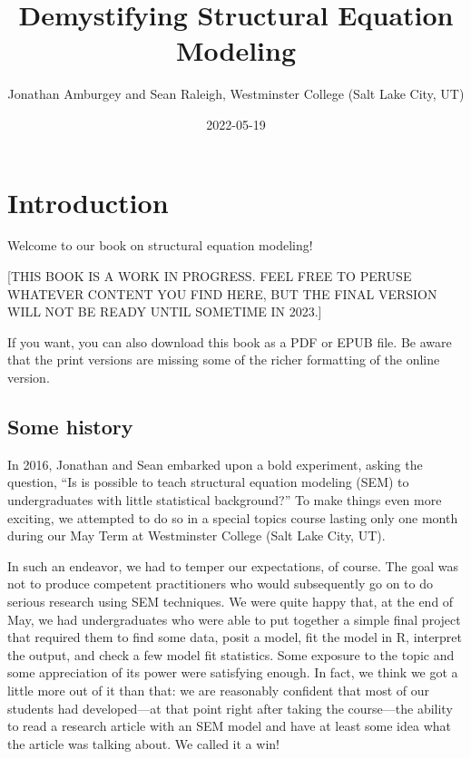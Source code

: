 \documentclass[
]{book}
\title{Demystifying Structural Equation Modeling}
\author{Jonathan Amburgey and Sean Raleigh, Westminster College (Salt Lake City, UT)}
\date{2022-05-19}
\begin{document}
\maketitle

{
\setcounter{tocdepth}{1}
\tableofcontents
}
\hypertarget{intro}{%
\chapter*{Introduction}\label{intro}}

Welcome to our book on structural equation modeling!

{[}THIS BOOK IS A WORK IN PROGRESS. FEEL FREE TO PERUSE WHATEVER CONTENT YOU FIND HERE, BUT THE FINAL VERSION WILL NOT BE READY UNTIL SOMETIME IN 2023.{]}

If you want, you can also download this book as a PDF or EPUB file. Be aware that the print versions are missing some of the richer formatting of the online version.

\hypertarget{intro-history}{%
\section*{Some history}\label{intro-history}}

In 2016, Jonathan and Sean embarked upon a bold experiment, asking the question, ``Is is possible to teach structural equation modeling (SEM) to undergraduates with little statistical background?'' To make things even more exciting, we attempted to do so in a special topics course lasting only one month during our May Term at Westminster College (Salt Lake City, UT).

In such an endeavor, we had to temper our expectations, of course. The goal was not to produce competent practitioners who would subsequently go on to do serious research using SEM techniques. We were quite happy that, at the end of May, we had undergraduates who were able to put together a simple final project that required them to find some data, posit a model, fit the model in R, interpret the output, and check a few model fit statistics. Some exposure to the topic and some appreciation of its power were satisfying enough. In fact, we think we got a little more out of it than that: we are reasonably confident that most of our students had developed---at that point right after taking the course---the ability to read a research article with an SEM model and have at least some idea what the article was talking about. We called it a win!
\end{document}

